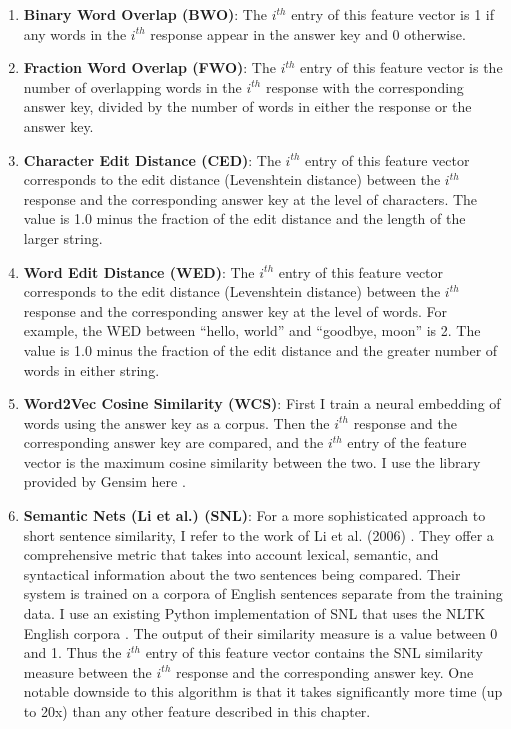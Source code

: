 \begin{enumerate}
\item \textbf{Binary Word Overlap (BWO)}: The $i^{th}$ entry of this feature vector is 1 if any words in the $i^{th}$ response appear in the answer key and 0 otherwise.
\item \textbf{Fraction Word Overlap (FWO)}: The $i^{th}$ entry of this feature vector is the number of overlapping words in the $i^{th}$ response with the corresponding answer key, divided by the number of words in either the response or the answer key.  
\item \textbf{Character Edit Distance (CED)}: The $i^{th}$ entry of this feature vector corresponds to the edit distance (Levenshtein distance) between the $i^{th}$ response and the corresponding answer key at the level of characters. The value is 1.0 minus the fraction of the edit distance and the length of the larger string.
\item \textbf{Word Edit Distance (WED)}:  The $i^{th}$ entry of this feature vector corresponds to the edit distance (Levenshtein distance) between the $i^{th}$ response and the corresponding answer key at the level of words. For example, the WED between ``hello, world'' and ``goodbye, moon'' is 2. The value is 1.0 minus the fraction of the edit distance and the greater number of words in either string.
\item \textbf{Word2Vec Cosine Similarity (WCS)}: First I train a neural embedding of words using the answer key as a corpus. Then the $i^{th}$ response and the corresponding answer key are compared, and the $i^{th}$ entry of the feature vector is the maximum cosine similarity between the two. I use the library provided by Gensim here \cite{rehurek10}.
\item \textbf{Semantic Nets (Li et al.) (SNL)}: For a more sophisticated approach to short sentence similarity, I refer to the work of Li et al. (2006) \cite{li06}. They offer a comprehensive metric that takes into account lexical, semantic, and syntactical information about the two sentences being compared. Their system is trained on a corpora of English sentences separate from the training data. I use an existing Python implementation of SNL that uses the NLTK English corpora \cite{nltk}. The output of their similarity measure is a value between 0 and 1. Thus the $i^{th}$ entry of this feature vector contains the SNL similarity measure between the $i^{th}$ response and the corresponding answer key. One notable downside to this algorithm is that it takes significantly more time (up to 20x) than any other feature described in this chapter.
\end{enumerate}

